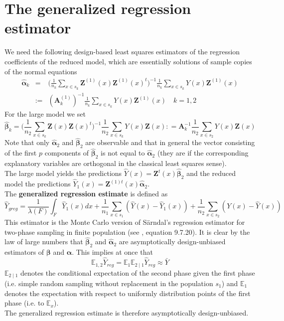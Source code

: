 \documentclass[a4paper,12pt,leqno, titlepage]{article}
\newcommand{\EX}{\mathbb{E}}
\begin{document}
\section{The generalized regression estimator}
We need the following design-based least squares estimators of the regression coefficients of the reduced model, which are essentially solutions of sample copies of the normal equations
\begin{eqnarray}\label{coeff1}
\hat{\pmb{\alpha}}_k &=& \Big(\frac{1}{n_k}\sum_{x\in{s}_k}\pmb{Z}^{(1)}(x)\pmb{Z}^{(1)}(x)^t
\Big)^{-1}\frac{1}{n_k}\sum_{x\in{s}_k}Y(x)\pmb{Z}^{(1)}(x)\nonumber\\
&:=&(\pmb{A}^{(1)}_k)^{-1}
\frac{1}{n_k}\sum_{x\in{s}_k}Y(x)\pmb{Z}^{(1)}(x)\quad k=1,2
\end{eqnarray}
For the large model we set
\begin{equation}\label{coeff2}
\hat{\pmb{\beta}}_{k}=\Big(\frac{1}{n_2}\sum_{x\in{s}_k}\pmb{Z}(x)\pmb{Z}(x)^t
\Big)^{-1}\frac{1}{n_2}\sum_{x\in{s}_k}Y(x)\pmb{Z}(x):
=\pmb{A}^{-1}_k\frac{1}{n_2}\sum_{x\in{s}_2}Y(x)\pmb{Z}(x)
\end{equation}
Note that only $\hat{\pmb{\alpha}}_2$ and $\hat{\pmb{\beta}}_2$ are observable and that
in general the vector consisting of the first $p$ components of $\hat{\pmb{\beta}}_{2}$ is not equal to $\hat{\pmb{\alpha}}_2$ (they are if the corresponding explanatory variables are orthogonal in the classical least squares sense).\\
The large model yields the predictions $\hat{Y}(x)=\pmb{Z}^t(x)\hat{\pmb{\beta}}_{2}$ and the reduced model the predictions $\hat{Y}_1(x)=\pmb{Z}^{(1)t}(x)\hat{\pmb{\alpha}}_2$.\\
The \textbf{generalized regression estimate} is defined as
\begin{equation}\label{ygreg1}
\hat{Y}_{greg} = \frac{1}{\lambda(F)}\int_F \hat{Y}_1(x)dx
+\frac{1}{n_1}\sum_{x\in{s}_1}(\hat{Y}(x)-\hat{Y}_1(x))
+ \frac{1}{n_2}\sum_{x\in{s}_2}(Y(x)-\hat{Y}(x))
\end{equation}
This estimator is the Monte Carlo version of S\"{a}rndal's  regression estimator for two-phase sampling in finite population (see \cite{sarndal}, equation 9.7.20). It is clear by the law of large numbers that  $\hat{\pmb{\beta}}_2$ and $\hat{\pmb{\alpha}}_2$ are asymptotically design-unbiased estimators of $\pmb{\beta}$ and $\pmb{\alpha}$. This implies at once that
$$\EX_{1,2}\hat{Y}_{reg}= \EX_1\EX_{2 \mid 1}\hat{Y}_{reg} \approx \bar{Y}$$
$ \EX_{2 \mid 1}$ denotes the conditional expectation of the second phase given the first phase (i.e. simple random sampling without replacement in the population $s_1$) and $\EX_1$ denotes the expectation with respect to uniformly distribution points of the first phase (i.e. to $\EX_x$).\\The generalized regression estimate is therefore asymptotically design-unbiased.\\
\end{document}
